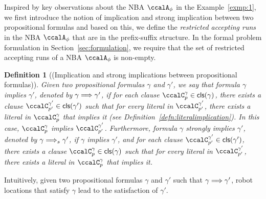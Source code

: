 \documentclass[Afour,sageh,times]{sagej}
\newtheorem{defn}[thm]{Definition}
\newcommand{\clause}[1]{\mathsf{cls}(#1)}
\newcommand{\autop}{\ccalA_{\phi}}
\newcommand{\simplies}{\DOTSB\Longrightarrow}
\begin{document}
 Inspired by key observations about the NBA $\autop$ in the Example~\ref{exmp:1}, we first introduce the notion of implication and strong implication between two propositional formulas and based on this, we define the {\it restricted accepting runs} in the NBA $\autop$ that are in the prefix-suffix structure. In the formal problem formulation in Section~\ref{sec:formulation}, we require that the set of restricted accepting runs of a NBA $\autop$ is non-empty.

 \begin{defn}[(Implication and strong implications between propositional formulas)]\label{defn:implication}
   Given two propositional formulas $\gamma$ and $\gamma'$, we say that formula  $\gamma$ implies $\gamma'$, denoted by $\gamma \simplies \gamma'$, if for each clause $\ccalC_{p}^{\gamma} \in \clause{\gamma}$, there exists a clause $\ccalC_{p'}^{\gamma'} \in \clause{\gamma'}$ such that for every literal in $\ccalC_{p'}^{\gamma'}$, there exists a literal in $\ccalC_{p}^{\gamma}$ that implies it (see Definition~\ref{defn:literalimplication}). In this case, $\ccalC_{p}^{\gamma}$ implies $\ccalC_{p'}^{\gamma'}$. Furthermore, formula $\gamma$ strongly implies $\gamma'$, denoted by $\gamma \simplies_s  \gamma'$, if $\gamma$ implies $\gamma'$, and for each clause $\ccalC_{p'}^{\gamma'} \in \clause{\gamma'}$, there exists a clause $\ccalC_{p}^{\gamma} \in \clause{\gamma}$  such that for every literal in $\ccalC_{p'}^{\gamma'}$, there exists a literal in $\ccalC_{p}^{\gamma}$ that implies it.
 \end{defn}

 Intuitively, given two propositional formulas $\gamma$ and $\gamma'$ such that $\gamma \simplies \gamma'$, robot locations that satisfy $\gamma$ lead to the satisfaction of $\gamma'$.
\end{document}
